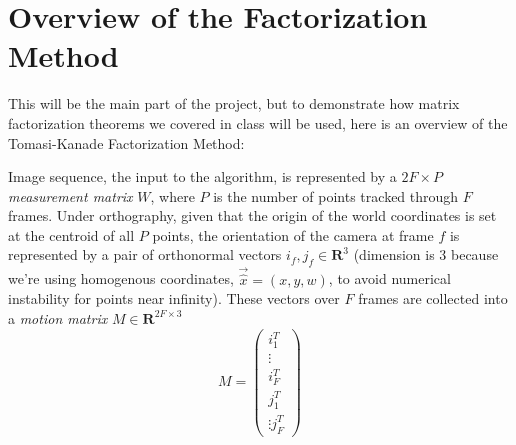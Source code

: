 \documentclass[a4paper]{article}
\begin{document}
\section{Overview of the Factorization Method}
This will be the main part of the project, but to demonstrate how
matrix factorization theorems we covered in class will be used, here
is an overview of the Tomasi-Kanade Factorization Method:

Image sequence, the input to the algorithm, is represented by a $2F\times P$ \emph{measurement matrix
}$W$, where  $P$ is the number of points tracked through $F$
frames. Under orthography, given that the origin of the world
coordinates is set at the centroid of all $P$ points, the orientation
of the camera at frame $f$ is represented by a pair of orthonormal
vectors $i_f, j_f \in \mathbf{R}^{3}$ (dimension is 3 because we're
using homogenous coordinates, $\vec \hat x = (x,y,w)$, to avoid numerical instability for points
near infinity). These vectors over $F$ frames are collected into a
\emph{motion matrix} $M\in \mathbf{R}^{2F \times 3}$ $$M =
\begin{pmatrix}
  i_1^T\\ \vdots \\  i_F^T \\ j_1^T \\ \vdots j_F^T
\end{pmatrix}
$$






\end{document}
